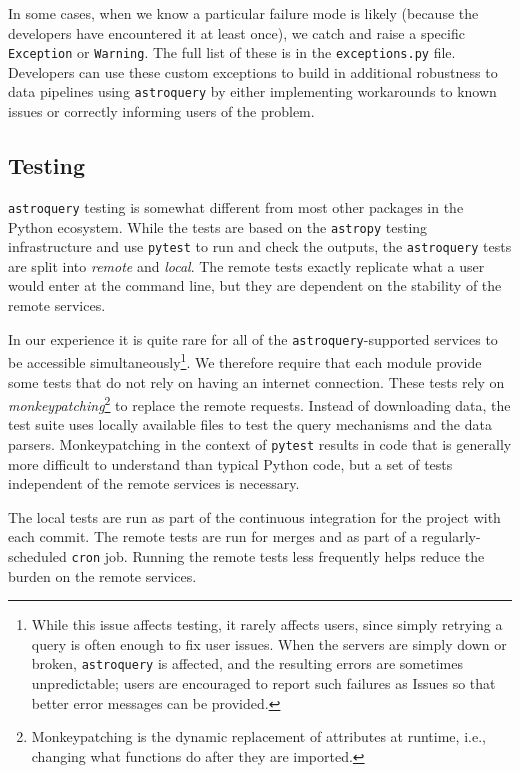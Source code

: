\documentclass[twocolumn]{aastex62}
\newcommand{\package}[1]{\texttt{#1}\xspace}
\newcommand{\astroquery}{\package{astroquery}}
\newcommand{\astropypkg}{\package{astropy}}
\begin{document}
In some cases, when we know a particular failure mode is likely (because the
developers have encountered it at least once), we catch and raise a specific
\texttt{Exception} or \texttt{Warning}.  The full list of these is in the 
\texttt{exceptions.py} file.  Developers can use these custom exceptions
to build in additional robustness to data pipelines using \astroquery
by either implementing workarounds to known issues or correctly informing
users of the problem.

\subsection{Testing}
\astroquery testing is somewhat different from most other packages in the Python
ecosystem.  While the tests are based on the \astropypkg testing infrastructure and use
\package{pytest} to run and check the outputs, the \astroquery tests are split into
\emph{remote} and \emph{local}.  The remote tests exactly replicate what a user
would enter at the command line, but they are dependent on the stability of the
remote services.

In our experience it is quite rare for all of the \astroquery-supported
services to be accessible simultaneously\footnote{While this issue affects
testing, it rarely affects users, since simply retrying a query is often
enough to fix user issues.  When the servers are simply down or broken,
\astroquery is affected, and the resulting errors are sometimes unpredictable;
users are encouraged to report such failures as Issues so that better error
messages can be provided.}. We therefore require that each
module provide some tests that do not rely on having an internet connection.
These tests rely on \emph{monkeypatching}\footnote{Monkeypatching is the
  dynamic replacement of attributes at runtime, i.e., changing what
  functions do after they are imported.} to replace the remote
requests. Instead of downloading data, the test suite uses locally available
files to test the query mechanisms and the data parsers.  Monkeypatching in
the context of \package{pytest} results in code that is generally more
difficult to understand than typical Python code, but a set of tests
independent of the remote services is necessary.

The local tests are run as part of the continuous integration for the
project with each commit.  The remote tests are run for merges and as part of a
regularly-scheduled \texttt{cron} job.  Running the remote tests less frequently
helps reduce the burden on the remote services.
\end{document}

